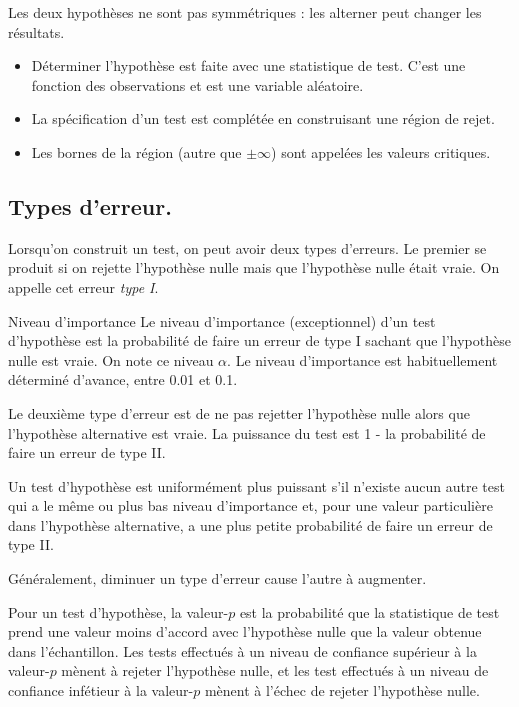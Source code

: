 Les deux hypothèses ne sont pas symmétriques : les alterner peut changer les résultats. 

\begin{itemize}
	\item Déterminer l'hypothèse est faite avec une statistique de test. C'est une fonction des observations et est une variable aléatoire. 
	\item La spécification d'un test est complétée en construisant une région de rejet. 
	\item Les bornes de la région (autre que $\pm \infty$) sont appelées les valeurs critiques. 
\end{itemize}

\subsection{Types d'erreur.}

Lorsqu'on construit un test, on peut avoir deux types d'erreurs. Le premier se produit si on rejette l'hypothèse nulle mais que l'hypothèse nulle était vraie. On appelle cet erreur \textit{type I}. 

\begin{definition}{Niveau d'importance}{}
	Le niveau d'importance (exceptionnel) d'un test d'hypothèse est la probabilité de faire un erreur de type I sachant que l'hypothèse nulle est vraie. On note ce niveau $\alpha$. Le niveau d'importance est habituellement déterminé d'avance, entre 0.01 et 0.1. 
\end{definition}

Le deuxième type d'erreur est de ne pas rejetter l'hypothèse nulle alors que l'hypothèse alternative est vraie. La puissance du test est 1 - la probabilité de faire un erreur de type II. 

\begin{definition}{}{}
	Un test d'hypothèse est uniformément plus puissant s'il n'existe aucun autre test qui a le même ou plus bas niveau d'importance et, pour une valeur particulière dans l'hypothèse alternative, a une plus petite probabilité de faire un erreur de type II. 
\end{definition}
Généralement, diminuer un type d'erreur cause l'autre à augmenter. 

\begin{definition}{}{}
	Pour un test d'hypothèse, la valeur-$p$ est la probabilité que la statistique de test prend une valeur moins d'accord avec l'hypothèse nulle que la valeur obtenue dans l'échantillon. Les tests effectués à un niveau de confiance supérieur à la valeur-$p$ mènent à rejeter l'hypothèse nulle, et les test effectués à un niveau de confiance infétieur à la valeur-$p$ mènent à l'échec de rejeter l'hypothèse nulle. 
\end{definition}
